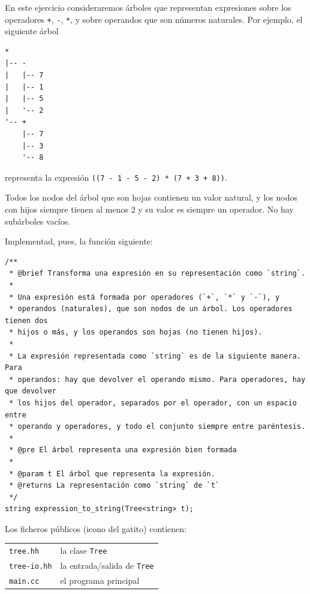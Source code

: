 
\Statement

En este ejercicio consideraremos árboles que representan expresiones sobre los operadores \verb|+|, \verb|-|, \verb|*|, y sobre operandos que son números naturales. Por ejemplo, el siguiente árbol 

\begin{verbatim}
*
|-- -
|   |-- 7
|   |-- 1
|   |-- 5
|   '-- 2
'-- +
    |-- 7
    |-- 3
    '-- 8
\end{verbatim}

representa la expresión \verb|((7 - 1 - 5 - 2) * (7 + 3 + 8))|.

\medskip

Todos los nodos del árbol que son hojas contienen un valor natural, y los nodos con hijos siempre tienen al menos 2 y su valor es siempre un operador. No hay subárboles vacíos.

Implementad, pues, la función siguiente:

\begin{verbatim}
/**
 * @brief Transforma una expresión en su representación como `string`.
 *
 * Una expresión está formada por operadores (`+`, `*` y `-`), y
 * operandos (naturales), que son nodos de un árbol. Los operadores tienen dos
 * hijos o más, y los operandos son hojas (no tienen hijos).
 *
 * La expresión representada como `string` es de la siguiente manera. Para
 * operandos: hay que devolver el operando mismo. Para operadores, hay que devolver
 * los hijos del operador, separados por el operador, con un espacio entre 
 * operando y operadores, y todo el conjunto siempre entre paréntesis.
 *
 * @pre El árbol representa una expresión bien formada
 *
 * @param t El árbol que representa la expresión.
 * @returns La representación como `string` de `t`
 */
string expression_to_string(Tree<string> t);  
\end{verbatim}

\Observation

Los ficheros públicos (icono del gatito) contienen:

\medskip

\begin{tabular}{ll}
 \verb|tree.hh| & la clase \verb|Tree| \\
 \verb|tree-io.hh| & la entrada/salida de \verb|Tree| \\
 \verb|main.cc| & el programa principal \\
\end{tabular}

